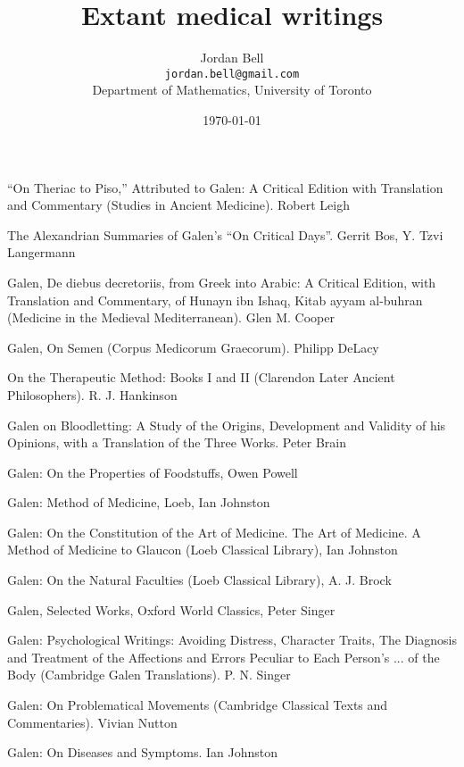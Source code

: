 \documentclass{article}
\begin{document}
\title{Extant medical writings}
\author{Jordan Bell\\ \texttt{jordan.bell@gmail.com}\\Department of Mathematics, University of Toronto}
\date{\today}

\maketitle

``On Theriac to Piso,'' Attributed to Galen: A Critical Edition with Translation and Commentary (Studies in Ancient Medicine). 
Robert Leigh

The Alexandrian Summaries of Galen's ``On Critical Days''. Gerrit Bos, Y. Tzvi Langermann

Galen, De diebus decretoriis, from Greek into Arabic: A Critical Edition, with Translation and Commentary, of Hunayn ibn Ishaq, Kitab ayyam al-buhran (Medicine in the Medieval Mediterranean). Glen M. Cooper

Galen, On Semen (Corpus Medicorum Graecorum). Philipp DeLacy

On the Therapeutic Method: Books I and II (Clarendon Later Ancient Philosophers). R. J. Hankinson

Galen on Bloodletting: A Study of the Origins, Development and Validity of his Opinions, with a Translation of the Three Works.
Peter Brain

Galen: On the Properties of Foodstuffs, Owen Powell

Galen: Method of Medicine, Loeb, Ian Johnston

Galen: On the Constitution of the Art of Medicine. The Art of Medicine. A Method of Medicine to Glaucon (Loeb Classical Library), Ian
Johnston

Galen: On the Natural Faculties (Loeb Classical Library), A. J. Brock

Galen, Selected Works, Oxford World Classics, Peter Singer

Galen: Psychological Writings: Avoiding Distress, Character Traits, The Diagnosis and Treatment of the Affections and Errors Peculiar to Each Person's ... of the Body (Cambridge Galen Translations). P. N. Singer

Galen: On Problematical Movements (Cambridge Classical Texts and Commentaries). Vivian Nutton

Galen: On Diseases and Symptoms. Ian Johnston
\end{document}
